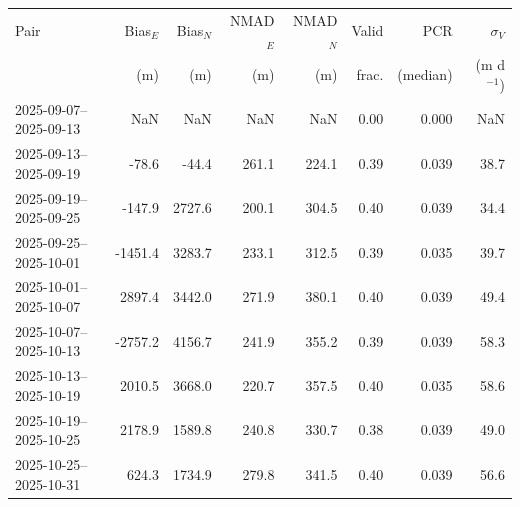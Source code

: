 \begin{tabular}{lrrrrrrr}
\toprule
Pair & Bias$_E$ & Bias$_N$ & NMAD$_E$ & NMAD$_N$ & Valid & PCR & $\sigma_V$ \\
& (m) & (m) & (m) & (m) & frac. & (median) & (m d$^{-1}$) \\
\midrule
2025-09-07--2025-09-13 & NaN & NaN & NaN & NaN & 0.00 & 0.000 & NaN \\
2025-09-13--2025-09-19 & -78.6 & -44.4 & 261.1 & 224.1 & 0.39 & 0.039 & 38.7 \\
2025-09-19--2025-09-25 & -147.9 & 2727.6 & 200.1 & 304.5 & 0.40 & 0.039 & 34.4 \\
2025-09-25--2025-10-01 & -1451.4 & 3283.7 & 233.1 & 312.5 & 0.39 & 0.035 & 39.7 \\
2025-10-01--2025-10-07 & 2897.4 & 3442.0 & 271.9 & 380.1 & 0.40 & 0.039 & 49.4 \\
2025-10-07--2025-10-13 & -2757.2 & 4156.7 & 241.9 & 355.2 & 0.39 & 0.039 & 58.3 \\
2025-10-13--2025-10-19 & 2010.5 & 3668.0 & 220.7 & 357.5 & 0.40 & 0.035 & 58.6 \\
2025-10-19--2025-10-25 & 2178.9 & 1589.8 & 240.8 & 330.7 & 0.38 & 0.039 & 49.0 \\
2025-10-25--2025-10-31 & 624.3 & 1734.9 & 279.8 & 341.5 & 0.40 & 0.039 & 56.6 \\
\bottomrule
\end{tabular}
